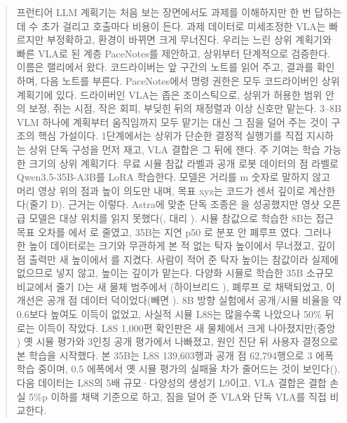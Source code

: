 \begin{abstract}
프런티어 LLM 계획기는 처음 보는 장면에서도 과제를 이해하지만 한 번 답하는 데 수 초가 걸리고 호출마다 비용이 든다. 과제 데이터로 미세조정한 VLA는 빠르지만 부정확하고, 환경이 바뀌면 크게 무너진다. 우리는 느린 상위 계획기와 빠른 VLA로 된 계층 PaceNotes를 제안하고, 상위부터 단계적으로 검증한다. 이름은 랠리에서 왔다. 코드라이버는 앞 구간의 노트를 읽어 주고, 결과를 확인하며, 다음 노트를 부른다. PaceNotes에서 명령 권한은 모두 코드라이버인 상위 계획기에 있다. 드라이버인 VLA는 좁은 조이스틱으로, 상위가 허용한 범위 안의 보정, 쥐는 시점, 작은 회피, 부딪힌 뒤의 재정렬과 이상 신호만 맡는다. 3--8B VLM 하나에 계획부터 움직임까지 모두 맡기는 대신 그 짐을 덜어 주는 것이 구조의 핵심 가설이다. 1단계에서는 상위가 단순한 결정적 실행기를 직접 지시하는 상위 단독 구성을 먼저 재고, VLA 결합은 그 뒤에 잰다. 주 기여는 학습 가능한 크기의 상위 계획기다. 무료 시뮬 참값 라벨과 공개 로봇 데이터의 점 라벨로 Qwen3.5-35B-A3B를 LoRA 학습한다. 모델은 거리를 m 숫자로 말하지 않고 머리 영상 위의 점과 높이 의도만 내며, 목표 xyz는 코드가 센서 깊이로 계산한다(줄기 D). 근거는 이렇다. Astra에 맞춘 단독 조종은 을 성공했지만 영샷 오픈급 모델은 대상 위치를 읽지 못했다(, 대리 ). 시뮬 참값으로 학습한 8B는 접근 목표 오차를 에서 로 줄였고, 35B는 지연 p50 로 분포 안 폐루프 였다. 그러나 한 높이 데이터로는 크기와 무관하게 본 적 없는 탁자 높이에서 무너졌고, 깊이 점 출력만 새 높이에서 를 지켰다. 사람이 적어 준 탁자 높이는 참값이라 실제에 없으므로 넣지 않고, 높이는 깊이가 맡는다. 다양화 시뮬로 학습한 35B 소규모 비교에서 줄기 D는 새 물체 범주에서 (하이브리드 ), 폐루프 로 채택되었고, 이 개선은 공개 점 데이터 덕이었다(빼면 ). 8B 방향 실험에서 공개/시뮬 비율을 약 0.6보다 높여도 이득이 없었고, 사실적 시뮬 L8S는 많을수록 나았으나 50\% 뒤로는 이득이 작았다. L8S 1,000편 확인판은 새 물체에서 크게 나아졌지만(중앙 ) 옛 시뮬 평가와 3인칭 공개 평가에서 나빠졌고, 원인 진단 뒤 사용자 결정으로 본 학습을 시작했다. 본 35B는 L8S 139,603행과 공개 점 62,794행으로 3 에폭 학습 중이며, 0.5 에폭에서 옛 시뮬 평가의 실패율 차가 줄어드는 것이 보인다(). 다음 데이터는 L8S의 5배 규모·다양성의 생성기 L9이고, VLA 결합은 결합 손실 5\%p 이하를 채택 기준으로 하고, 짐을 덜어 준 VLA와 단독 VLA를 직접 비교한다.
\end{abstract}
